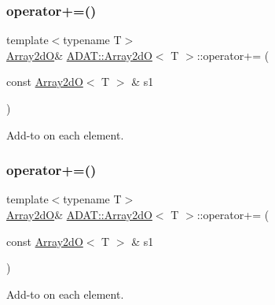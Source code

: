 \subsubsection{\texorpdfstring{operator+=()}{operator+=()}\hspace{0.1cm}{\footnotesize\ttfamily [1/6]}}
{\footnotesize\ttfamily template$<$typename T$>$ \\
\mbox{\hyperlink{classADAT_1_1Array2dO}{Array2dO}}\& \mbox{\hyperlink{classADAT_1_1Array2dO}{A\+D\+A\+T\+::\+Array2dO}}$<$ T $>$\+::operator+= (\begin{DoxyParamCaption}\item[{const \mbox{\hyperlink{classADAT_1_1Array2dO}{Array2dO}}$<$ T $>$ \&}]{s1 }\end{DoxyParamCaption})\hspace{0.3cm}{\ttfamily [inline]}}



Add-\/to on each element. 

\mbox{\label{classADAT_1_1Array2dO_ad74aea8e13378655e8abe2a2bbddb7bc}} 
\subsubsection{\texorpdfstring{operator+=()}{operator+=()}\hspace{0.1cm}{\footnotesize\ttfamily [2/6]}}
{\footnotesize\ttfamily template$<$typename T$>$ \\
\mbox{\hyperlink{classADAT_1_1Array2dO}{Array2dO}}\& \mbox{\hyperlink{classADAT_1_1Array2dO}{A\+D\+A\+T\+::\+Array2dO}}$<$ T $>$\+::operator+= (\begin{DoxyParamCaption}\item[{const \mbox{\hyperlink{classADAT_1_1Array2dO}{Array2dO}}$<$ T $>$ \&}]{s1 }\end{DoxyParamCaption})\hspace{0.3cm}{\ttfamily [inline]}}



Add-\/to on each element. 

\mbox{\label{classADAT_1_1Array2dO_ad74aea8e13378655e8abe2a2bbddb7bc}} 
